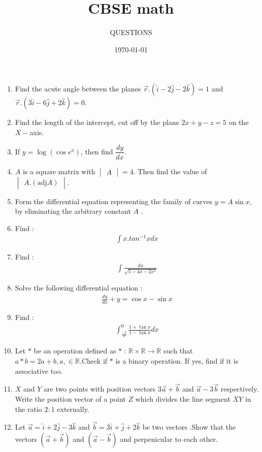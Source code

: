 \documentclass[10pt,-letter paper]{article}
\title{CBSE math}
\author{QUESTIONS}
\date{\today}
\providecommand{\brak}[1]{\ensuremath{\left(#1\right)}}
\newcommand{\mydet}[1]{\ensuremath{\begin{vmatrix}#1\end{vmatrix}}}
\begin{document}
\maketitle

\begin{enumerate}
\item Find the acute angle between the planes $\overrightarrow{r}.\brak{\hat{i}-2\hat{j}-2\hat{k}}=1$ and $\overrightarrow{r}.\brak{3\hat{i}-6\hat{j}+2\hat{k}}=0.$
\item Find the length of the intercept, cut off by the plane $2x + y - z = 5$ on the $X -$axis.
\item If $y = \log \brak{\cos e^x}$, then find $\dfrac{dy}{dx}$.
\item $ A $ is a square matrix with $\mydet{A} = 4 $. Then find the value of  $\mydet{ A .\brak{\text{adj} A}}$.
\item Form the differential equation representing the family of curves $y = A \sin x $, by eliminating the arbitrary constant $A$ .
\item Find :
	\begin{align*}
		\int x.tan^{-1}x dx
	\end{align*}
\item Find :
	\begin{align*}
		\int {\frac{dx}{\sqrt{5 -4 x - 2 x^{2}}}}
	\end{align*}
\item Solve the following differential equation :
	\begin{align*}
		\frac{dy}{dx}+y=\cos x - \sin x
	\end{align*}
\item Find :
	\begin{align*}
		\int_{\frac{-\pi}{4}}^{0}\frac{1+\tan x}{1-\tan x} dx
	\end{align*}
\item Let $*$ be an operation defined as $*$ : $\mathbb{R} \times \mathbb{R} \rightarrow \mathbb{R}$ such that $a * b = 2a + b,a, \in \mathbb{R}$.Check if $*$ is a binary operation. If yes, find if it is associative too.
\item $X$ and $Y$ are two points with position vectors ${3 \overrightarrow{a} + \overrightarrow{b}}$ and ${\overrightarrow{a} - 3 \overrightarrow{b}}$ respectively. Write the position vector of a point $Z$ which divides the line segment $XY$ in the ratio $2 : 1$ externally.
\item Let ${\overrightarrow{a} = \hat{i} + 2\hat{j} - 3\hat{k}}$ and ${\overrightarrow{b} = 3\hat{i} + \hat{j} + 2\hat{k}}$ be two vectors .Show that the vectors \brak{\overrightarrow{a} + \overrightarrow{b}} and \brak{\overrightarrow{a} - \overrightarrow{b}} and perpenicular to each other.

\end{enumerate}
\end{document}
